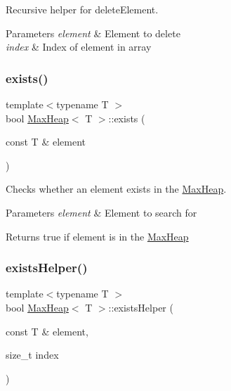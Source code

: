 Recursive helper for delete\+Element. 


\begin{DoxyParams}{Parameters}
{\em element} & Element to delete \\
\hline
{\em index} & Index of element in array \\
\hline
\end{DoxyParams}
\mbox{\label{class_max_heap_af8f92dc7cd91a6c65825ee23150ba143}} 
\subsubsection{\texorpdfstring{exists()}{exists()}}
{\footnotesize\ttfamily template$<$typename T $>$ \\
bool \hyperlink{class_max_heap}{Max\+Heap}$<$ T $>$\+::exists (\begin{DoxyParamCaption}\item[{const T \&}]{element }\end{DoxyParamCaption})}



Checks whether an element exists in the \hyperlink{class_max_heap}{Max\+Heap}. 


\begin{DoxyParams}{Parameters}
{\em element} & Element to search for \\
\hline
\end{DoxyParams}
\begin{DoxyReturn}{Returns}
true if element is in the \hyperlink{class_max_heap}{Max\+Heap} 
\end{DoxyReturn}
\mbox{\label{class_max_heap_a47d8b82e83d9877f8251d9b533fecea2}} 
\subsubsection{\texorpdfstring{exists\+Helper()}{existsHelper()}}
{\footnotesize\ttfamily template$<$typename T $>$ \\
bool \hyperlink{class_max_heap}{Max\+Heap}$<$ T $>$\+::exists\+Helper (\begin{DoxyParamCaption}\item[{const T \&}]{element,  }\item[{size\+\_\+t}]{index }\end{DoxyParamCaption})\hspace{0.3cm}{\ttfamily [private]}}



